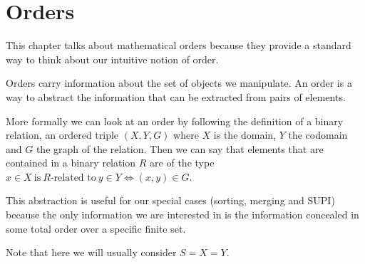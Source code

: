 \section{Orders}

This chapter talks about mathematical orders because they provide a standard way to think about our intuitive notion of order.

Orders carry information about the set of objects we manipulate. An order is a way to abstract the information that can be extracted from pairs of elements.

More formally we can look at an order by following the definition of a binary relation, an ordered triple $(X, Y, G)$ where $X$ is the domain, $Y$ the codomain and $G$ the graph of the relation.
Then we can say that elements that are contained in a binary relation $R$ are of the type $x \in X~\text{is}~R\text{-related to}~y \in Y \iff (x, y) \in G$.

This abstraction is useful for our special cases (sorting, merging and SUPI) because the only information we are interested in is the information concealed in some total order over a specific finite set.

Note that here we will usually consider $S = X = Y$.